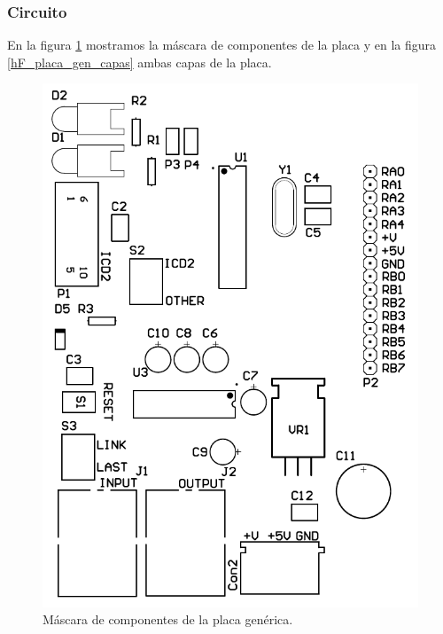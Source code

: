 \subsubsection{Circuito}
\label{h_placas_generica_circuito}

En la figura \ref{hF_placa_gen_componentes} mostramos la m\'ascara de componentes de la placa y en
la figura \ref{hF_placa_gen_capas} ambas capas de la placa.

\begin{figure}
	\centering
	\includegraphics[scale=.2]{figuras/gen_componentes.png}
	\caption{M\'ascara de componentes de la placa gen\'erica.}
	\label{hF_placa_gen_componentes}
\end{figure}

